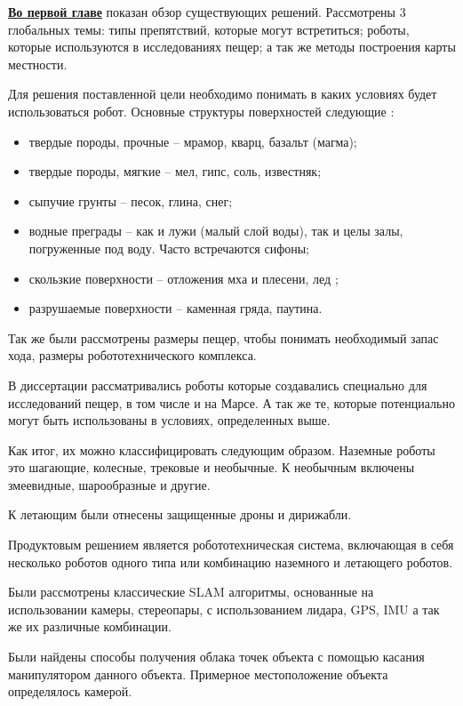 
\textbf{\underline{Во первой главе}} показан обзор существующих решений. Рассмотрены 3 глобальных темы: типы препятствий, которые могут встретиться; роботы, которые используются в исследованиях пещер; а так же методы построения карты местности.

Для решения поставленной цели необходимо понимать в каких условиях будет использоваться робот. Основные структуры поверхностей следующие :
\begin{itemize}
    \item твердые породы, прочные -- мрамор, кварц, базальт (магма);
    \item твердые породы, мягкие -- мел, гипс, соль, известняк;
    \item сыпучие грунты -- песок, глина, снег;
    \item водные преграды -- как и лужи (малый слой воды), так и целы залы, погруженные под воду. Часто встречаются сифоны;
    \item скользкие поверхности -- отложения мха и плесени, лед ;
    \item разрушаемые поверхности -- каменная гряда, паутина.
\end{itemize}



Так же были рассмотрены размеры пещер, чтобы понимать необходимый запас хода, размеры робототехнического комплекса.

В диссертации рассматривались роботы которые создавались специально для исследований пещер, в том числе и на Марсе. А так же те, которые потенциально могут быть использованы в условиях, определенных выше.

Как итог, их можно классифицировать следующим образом. Наземные роботы это шагающие, колесные, трековые и необычные. К необычным включены змеевидные, шарообразные и другие.

К летающим были отнесены защищенные дроны и дирижабли.

Продуктовым решением является робототехническая система, включающая в себя несколько роботов одного типа или комбинацию наземного и летающего роботов.

Были рассмотрены классические SLAM алгоритмы, основанные на использовании камеры, стереопары, с использованием лидара, GPS, IMU а так же их различные комбинации.

Были найдены способы получения облака точек объекта с помощью касания манипулятором данного объекта. Примерное местоположение объекта определялось камерой.

